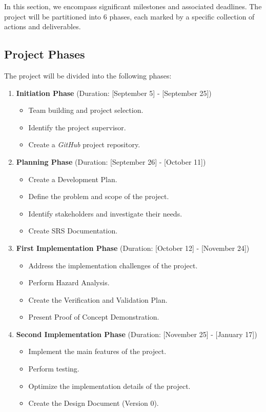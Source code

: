 \documentclass{article}
\begin{document}
In this section, we encompass significant milestones and associated deadlines. The project will be partitioned into 6 phases, each marked by a specific collection of actions and deliverables.

\subsection{Project Phases}

The project will be divided into the following phases:

\begin{enumerate}
  \item \textbf{Initiation Phase} (Duration: [September 5] - [September 25])
  \begin{itemize}
    \item Team building and project selection.
    \item Identify the project supervisor.
    \item Create a \textit{GitHub} project repository.
  \end{itemize}

  \item \textbf{Planning Phase} (Duration: [September 26] - [October 11])
  \begin{itemize}
    \item Create a Development Plan.
    \item Define the problem and scope of the project.
    \item Identify stakeholders and investigate their needs.
    \item Create SRS Documentation.
  \end{itemize}

  \item \textbf{First Implementation Phase} (Duration: [October 12] - [November 24])
  \begin{itemize}
    \item Address the implementation challenges of the project.
    \item Perform Hazard Analysis.
    \item Create the Verification and Validation Plan.
    \item Present Proof of Concept Demonstration.
  \end{itemize}
  
  \item \textbf{Second Implementation Phase} (Duration: [November 25] - [January 17])
  \begin{itemize}
    \item Implement the main features of the project.
    \item Perform testing.
    \item Optimize the implementation details of the project.
    \item Create the Design Document (Version 0).
  \end{itemize}


\end{enumerate}
\end{document}

